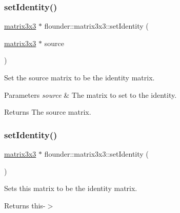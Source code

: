 \subsubsection{\texorpdfstring{set\+Identity()}{setIdentity()}\hspace{0.1cm}{\footnotesize\ttfamily [1/2]}}
{\footnotesize\ttfamily \hyperlink{classflounder_1_1matrix3x3}{matrix3x3} $\ast$ flounder\+::matrix3x3\+::set\+Identity (\begin{DoxyParamCaption}\item[{\hyperlink{classflounder_1_1matrix3x3}{matrix3x3} $\ast$}]{source }\end{DoxyParamCaption})\hspace{0.3cm}{\ttfamily [static]}}



Set the source matrix to be the identity matrix. 


\begin{DoxyParams}{Parameters}
{\em source} & The matrix to set to the identity. \\
\hline
\end{DoxyParams}
\begin{DoxyReturn}{Returns}
The source matrix. 
\end{DoxyReturn}
\mbox{\label{classflounder_1_1matrix3x3_a64d71b44dc94a221da4ed01ac5cbcbf8}} 
\subsubsection{\texorpdfstring{set\+Identity()}{setIdentity()}\hspace{0.1cm}{\footnotesize\ttfamily [2/2]}}
{\footnotesize\ttfamily \hyperlink{classflounder_1_1matrix3x3}{matrix3x3} $\ast$ flounder\+::matrix3x3\+::set\+Identity (\begin{DoxyParamCaption}{ }\end{DoxyParamCaption})}



Sets this matrix to be the identity matrix. 

\begin{DoxyReturn}{Returns}
this-\/$>$ 
\end{DoxyReturn}
\mbox{\label{classflounder_1_1matrix3x3_abfa43745d8f828a4751dc727c3186546}} 
